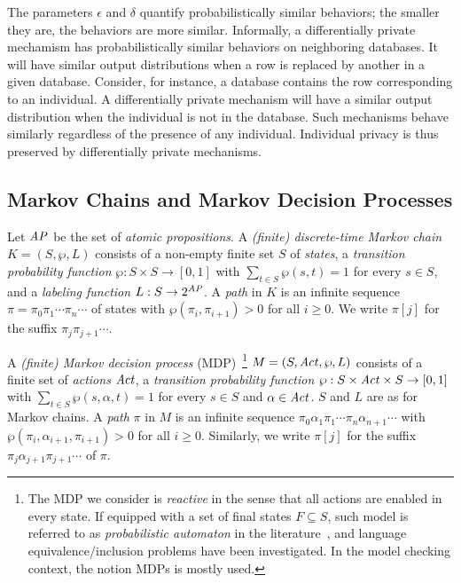 The parameters $\epsilon$ and $\delta$ quantify probabilistically
similar behaviors;
the smaller they are, the behaviors are more similar.
Informally, a differentially private mechamism has probabilistically
similar behaviors on neighboring databases. It will have similar
output distributions when a row is replaced by another in a given
database. Consider, for instance, a database contains the row
corresponding to an individual. A differentially private mechanism
will have a similar output distribution when the individual is not in
the database. Such mechanisms behave similarly regardless of the
presence of any individual. Individual privacy is thus
preserved by differentially private mechanisms.

\subsection{Markov Chains and Markov Decision Processes}

Let $\mathit{AP}$ be the set of \emph{atomic propositions}.
A \emph{(finite) discrete-time Markov chain} $K = (S, \wp, L)$ consists
of a non-empty finite set $S$ of \emph{states}, a \emph{transition
  probability function} $\wp : S \times S \rightarrow [0, 1]$ with
$\sum_{t \in S} \wp(s, t) = 1$ for every $s \in S$, and
a \emph{labeling function} $L : S \rightarrow 2^{\mathit{AP}}$. A \emph{path}
in $K$ is an infinite sequence $\pi = \pi_0 \pi_1 \cdots \pi_n \cdots$
of states with $\wp (\pi_i, \pi_{i+1}) > 0$ for all $i \geq 0$. We write
$\pi[j]$ for the suffix $\pi_j \pi_{j+1} \cdots$. %

A \emph{(finite) Markov decision process}
(MDP)~\footnote{The MDP we consider is \emph{reactive} in the sense that
all actions are enabled in every state. If equipped with a set of final states $F\subseteq S$, such model is
referred to as \emph{probabilistic automaton} in the literature~\cite{Rabin63}, and language equivalence/inclusion
problems have been investigated. In the model checking context, the notion MDPs is mostly used.}
 $M = (S, \mathit{Act}, \wp, L)$ consists
of
a finite set of \emph{actions} $\mathit{Act}$,
a \emph{transition probability function} $\wp : S \times \mathit{Act}
\times S \rightarrow [0, 1]$ with $\sum_{t \in S} \wp(s, \alpha, t)
= 1$ for every $s \in S$ and $\alpha \in \mathit{Act}$. $S$ and
$L$ are as for Markov chains.
A \emph{path} $\pi$ in $M$ is an infinite sequence $\pi_0 \alpha_1
\pi_1 \cdots \pi_n \alpha_{n+1} \cdots$ with
$\wp(\pi_i, \alpha_{i+1}, \pi_{i+1}) > 0$ for all $i \geq 0$.
Similarly, we write $\pi[j]$ for the suffix $\pi_j \alpha_{j+1}
\pi_{j+1} \cdots$ of $\pi$.

